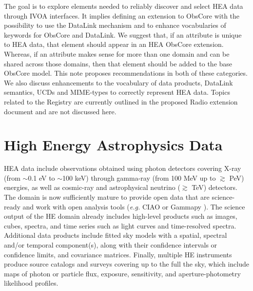 \documentclass[11pt,a4paper]{ivoa}
\begin{document}
The goal is to explore elements needed to reliably discover and select \gls{HEA} data through \gls{IVOA} interfaces. It implies defining an extension to ObsCore with the possibility to use the DataLink mechanism and to enhance vocabularies of keywords for ObsCore and DataLink. We suggest that, if an attribute is unique to \gls{HEA} data, that element should appear in an \gls{HEA} ObsCore extension. Whereas, if an attribute makes sense for more than one domain and can be shared across those domains, then that element should be added to the base ObsCore model. This note proposes recommendations in both of these categories. We also discuss enhancements to the vocabulary of data products, DataLink semantics, UCDs and MIME-types to correctly represent \gls{HEA} data. Topics related to the Registry are currently outlined in the proposed Radio extension document and are not discussed here.


\section{High Energy Astrophysics Data}

\gls{HEA} data include observations obtained using photon detectors covering X-ray (from $\sim$0.1 eV to $\sim$100 keV) through gamma-ray (from 100 MeV up to $\gtrsim$ PeV) energies, as well as cosmic-ray and astrophysical neutrino ($\gtrsim$ TeV) detectors. The domain is now sufficiently mature to provide open data that are science-ready and work with open analysis tools ({\em e.g.\/} CIAO \citep{2006SPIE.6270E..1VF} or Gammapy \citep{gammapy:2023}). The science output of the \gls{HE} domain already includes high-level products such as images, cubes, spectra, and time series such as light curves and time-resolved spectra. Additional data products include fitted sky models with a spatial, spectral and/or temporal component(s), along with their confidence intervals or confidence limits, and covariance matrices.   Finally, multiple \gls{HE} instruments produce source catalogs and surveys covering up to the full the sky, which include maps of photon or particle flux, exposure, sensitivity, and aperture-photometry likelihood profiles. 
\end{document}
